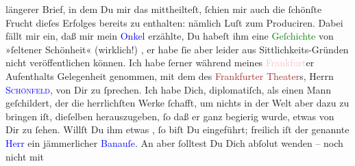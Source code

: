                längerer Brief, in dem Du mir das mittheilteſt, ſchien mir auch die ſchönſte Frucht
               dieſes Erfolges bereits zu enthalten: nämlich Luſt zum Produciren. Dabei fällt mir
               ein, daß mir mein \textcolor{blue}{Onkel}{}
               erzählte, Du habeſt ihm eine \textcolor{green}{Geſchichte}{} von »ſeltener Schönheit« (wirklich!) \label{K_L02668-4v}\label{K_L02668-4h}, er habe ſie aber leider aus Sittlichkeits-Gründen nicht veröffentlichen
               können.  Ich habe ſerner während meines \textcolor{pink}{Frankfurt}{}\ledrightnote{\textcolor{pink}{Frankfurt am Main}}er Aufenthalts Gelegenheit genommen, mit
               dem \label{K_L02668-5v}\label{K_L02668-5h} des
                  \textcolor{brown}{Frankfurter Theater}{}\ledrightnote{\textcolor{brown}{Frankfurter Stadt-Theater}}s, Herrn \textsc{\textcolor{blue}{Schönfeld}{}\ledrightnote{\textcolor{blue}{Karl Schönfeld}}}, von Dir zu ſprechen. Ich habe Dich, diplomatiſch, als einen Mann geſchildert,
               der die herrlichſten Werke ſchafft, um nichts in der Welt aber dazu zu bringen iſt,
               dieſelben herauszugeben, ſo daß er ganz begierig wurde, etwas von Dir zu ſehen.
               Willſt Du ihm etwas \label{K_L02668-6v}\label{K_L02668-6h}, ſo biſt Du
               eingeführt; freilich iſt der genannte \textcolor{blue}{Herr}{} ein jämmerlicher {\pb}\textcolor{blue}{Banauſe}{}. An \label{K_L02668-7v}\label{K_L02668-7h} aber ſolltest Du Dich abſolut wenden – noch nicht mit
